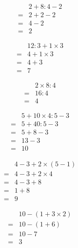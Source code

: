 \begin{multicols}{3}
  \begin{align*}
    &2+8:4-2\\
    =&2+2-2\\
    =&4-2\\
    =&2
  \end{align*}

  \begin{align*}
    &12:3+1\times 3\\
    =&4+1\times 3\\
    =&4+3\\
    =&7
  \end{align*}

  \begin{align*}
    &2\times 8:4\\
    =&16:4\\
    =&4
  \end{align*}
  \vspace{1em}
\end{multicols}

\separe
\begin{multicols}{3}
  \begin{align*}
    &5+10\times 4:5-3\\
    =&5+40:5-3\\
    =&5+8-3\\
    =&13-3\\
    =&10
  \end{align*}

  \begin{align*}
    &4-3+2\times (5-1)\\
    =&4-3+2\times 4\\
    =&4-3+8\\
    =&1+8\\
    =&9
  \end{align*}

  \begin{align*}
    &10-(1+3\times 2)\\
    =&10-(1+6)\\
    =&10-7\\
    =&3
  \end{align*}
\end{multicols}

\separe

